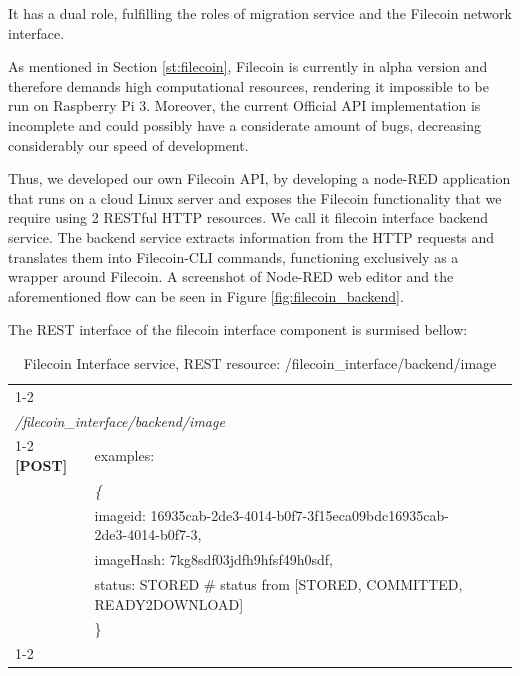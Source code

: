 It has a dual role, fulfilling the roles of migration service and the Filecoin network interface. 

As mentioned in Section \ref{st:filecoin}, Filecoin is currently in alpha version and therefore demands high computational resources, rendering it impossible to be run on Raspberry Pi 3. Moreover, the current Official API implementation is incomplete and could possibly have a considerate amount of bugs, decreasing considerably our speed of development. 

Thus, we developed our own Filecoin API, by developing a node-RED application that runs on a cloud Linux server and exposes the Filecoin functionality that we require using 2 RESTful HTTP resources. We call it filecoin interface backend service. The backend service extracts information from the HTTP requests and translates them into Filecoin-CLI commands, functioning exclusively as a wrapper around Filecoin. A screenshot of Node-RED web editor and the aforementioned flow can be seen in Figure \ref{fig:filecoin_backend}.

\noindent
The REST interface of the filecoin interface component is surmised bellow:
\begin{table}[H]
\centering
\begin{tabular}{|l|l|lll}
\cline{1-2}
\multicolumn{2}{|l|}{{\ul }} &  &  &  \\
\multicolumn{2}{|l|}{\textit{/filecoin\_interface/backend/image}} &  &  &  \\ \cline{1-2}
\textbf{{[}POST{]}} & examples: &  &  &  \\
 & \textit{\{} &  &  &  \\
 & imageid: 16935cab-2de3-4014-b0f7-3f15eca09bdc16935cab-2de3-4014-b0f7-3, &  &  &  \\
 & imageHash: 7kg8sdf03jdfh9hfsf49h0sdf, &  &  &  \\
 & status: STORED  \# status from {[}STORED, COMMITTED, READY2DOWNLOAD{]} &  &  &  \\
 & \} &  &  &  \\ \cline{1-2}
\end{tabular}
\caption{Filecoin Interface service, REST resource: /filecoin\_interface/backend/image }
\end{table} 


